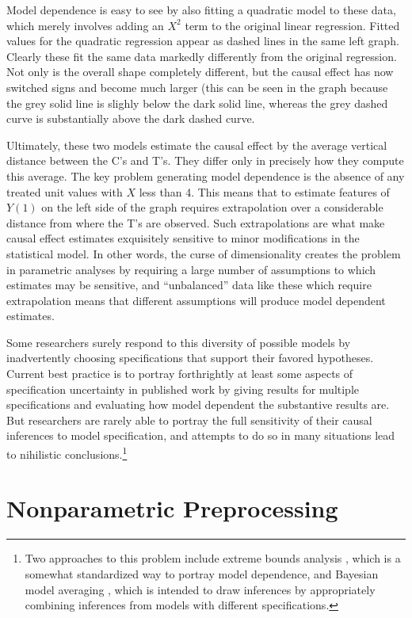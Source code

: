 \documentclass[11pt,titlepage]{article}
\begin{document}
Model dependence is easy to see by also fitting a quadratic model to
these data, which merely involves adding an $X^2$ term to the original
linear regression.  Fitted values for the quadratic regression appear
as dashed lines in the same left graph.  Clearly these fit the same
data markedly differently from the original regression.  Not only is
the overall shape completely different, but the causal effect has now
switched signs and become much larger (this can be seen in the graph
because the grey solid line is slighly below the dark solid line,
whereas the grey dashed curve is substantially above the dark dashed
curve.

Ultimately, these two models estimate the causal effect by the average
vertical distance between the C's and T's.  They differ only in
precisely how they compute this average.  The key problem generating
model dependence is the absence of any treated unit values with $X$
less than 4.  This means that to estimate features of $Y(1)$ on the
left side of the graph requires extrapolation over a considerable
distance from where the T's are observed.  Such extrapolations are
what make causal effect estimates exquisitely sensitive to minor
modifications in the statistical model.  In other words, the curse of
dimensionality creates the problem in parametric analyses by requiring
a large number of assumptions to which estimates may be sensitive, and
``unbalanced'' data like these which require extrapolation means that
different assumptions will produce model dependent estimates.

Some researchers surely respond to this diversity of possible models
by inadvertently choosing specifications that support their favored
hypotheses.  Current best practice is to portray forthrightly at least
some aspects of specification uncertainty in published work by giving
results for multiple specifications and evaluating how model dependent
the substantive results are.  But researchers are rarely able to
portray the full sensitivity of their causal inferences to model
specification, and attempts to do so in many situations lead to
nihilistic conclusions.\footnote{Two approaches to this problem
  include extreme bounds analysis \citep{Leamer78}, which is a
  somewhat standardized way to portray model dependence, and Bayesian
  model averaging \citep{HoeMadRaf99,ImaKin04}, which is intended to
  draw inferences by appropriately combining inferences from models
  with different specifications.}

\section{Nonparametric Preprocessing} \label{s:nonparpreproc}
\end{document}
